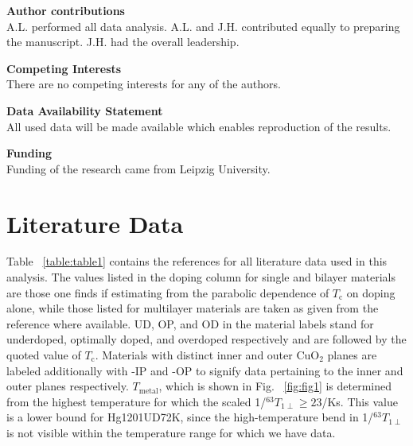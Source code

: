 \documentclass[preprint,superscriptaddress,amsmath,amssymb,aps,physrev,prb,floatfix, fleqn]{revtex4-2} \usepackage{bm} %
\makeatletter
\newcommand{\tc} {\ensuremath{T_{\mathrm c}}\@\xspace}
\makeatother
\begin{document}
{\flushleft \bf Author contributions\\}
A.L. performed all data analysis. A.L. and J.H. contributed equally to preparing the manuscript. J.H. had the overall leadership.

{\flushleft \bf Competing Interests\\}
{ There are no competing interests for any of the authors.}\par\medskip


{\flushleft \bf Data Availability Statement \\}
All used data will be made available which enables reproduction of the results.\par\medskip


{\flushleft \bf Funding\\}
Funding of the research came from Leipzig University.\par\medskip
\vspace{0.5cm}
%



\printindex

\newpage
\appendix
\section{Literature Data}
Table ~\ref{table:table1} contains the references for all literature data used in this analysis. The values listed in the doping column for single and bilayer materials are those one finds if estimating from the parabolic dependence of \tc on doping alone, while those listed for multilayer materials are taken as given from the reference where available. UD, OP, and OD in the material labels stand for underdoped, optimally doped, and overdoped respectively and are followed by the quoted value of \tc. Materials with distinct inner and outer CuO$_2$ planes are labeled additionally with -IP and -OP to signify data pertaining to the inner and outer planes respectively. $T_{\mathrm{metal}}$, which is shown in Fig. ~\ref{fig:fig1} is determined from the highest temperature for which the scaled 1/$^{63}T_{1\perp}\geq23$/Ks. This value is a lower bound for Hg1201UD72K, since the high-temperature bend in 1/$^{63}T_{1\perp}$ is not visible within the temperature range for which we have data.\\
\end{document}

